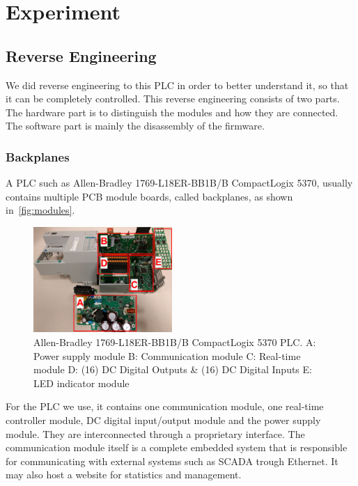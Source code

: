 \section{Experiment}
\label{sec:experiment}

\subsection{Reverse Engineering}
We did reverse engineering to this PLC in order to better understand it, so that it can be completely controlled. This reverse engineering consists of two parts. The hardware part is to distinguish the modules and how they are connected. The software part is mainly the disassembly of the firmware.

\subsubsection{Backplanes}

A PLC such as Allen-Bradley 1769-L18ER-BB1B/B CompactLogix 5370, usually contains multiple PCB module boards, called backplanes, as shown in~\autoref{fig:modules}.

\begin{figure}[th]
	\includegraphics[width=0.47\textwidth]{figures/modules}
	\centering
	\caption{Allen-Bradley 1769-L18ER-BB1B/B CompactLogix 5370 PLC. A: Power supply module  B: Communication module  C: Real-time module  D: (16) DC Digital Outputs \& (16) DC Digital Inputs  E: LED indicator module}
	\label{fig:modules}
\end{figure}

For the PLC we use, it contains one communication module, one real-time controller module, DC digital input/output module and the power supply module. They are interconnected through a proprietary interface. The communication module itself is a complete embedded system that is responsible for communicating with external systems such as SCADA trough Ethernet. It may also host a website for statistics and management.

